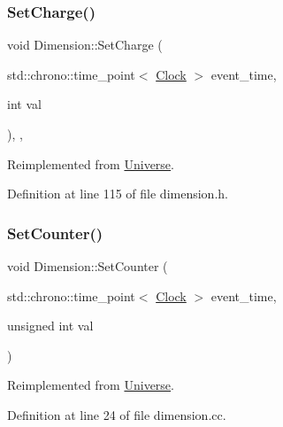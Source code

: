 \subsubsection{\texorpdfstring{Set\+Charge()}{SetCharge()}}
{\footnotesize\ttfamily void Dimension\+::\+Set\+Charge (\begin{DoxyParamCaption}\item[{std\+::chrono\+::time\+\_\+point$<$ \hyperlink{universe_8h_a0ef8d951d1ca5ab3cfaf7ab4c7a6fd80}{Clock} $>$}]{event\+\_\+time,  }\item[{int}]{val }\end{DoxyParamCaption})\hspace{0.3cm}{\ttfamily [inline]}, {\ttfamily [final]}, {\ttfamily [virtual]}}



Reimplemented from \hyperlink{class_universe_a3b3da7c86a7b75e5e5c0b7972ac82a87}{Universe}.



Definition at line 115 of file dimension.\+h.

\mbox{\label{class_dimension_a75c6a1a1e09c40b5860dc11a83384d9f}} 
\subsubsection{\texorpdfstring{Set\+Counter()}{SetCounter()}}
{\footnotesize\ttfamily void Dimension\+::\+Set\+Counter (\begin{DoxyParamCaption}\item[{std\+::chrono\+::time\+\_\+point$<$ \hyperlink{universe_8h_a0ef8d951d1ca5ab3cfaf7ab4c7a6fd80}{Clock} $>$}]{event\+\_\+time,  }\item[{unsigned int}]{val }\end{DoxyParamCaption})\hspace{0.3cm}{\ttfamily [virtual]}}



Reimplemented from \hyperlink{class_universe_aa22202ae740eb1355529afcb13285e91}{Universe}.



Definition at line 24 of file dimension.\+cc.

\mbox{\label{class_dimension_ad8c18ce6358904e01594092dca9f1311}} 
